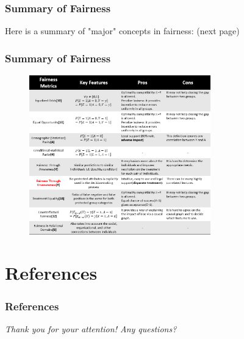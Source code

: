 \documentclass{beamer}
\begin{document}
\begin{frame}
\frametitle{Summary of Fairness}

Here is a summary of "major" concepts in fairness: (next page)

\end{frame}

\begin{frame}
\frametitle{Summary of Fairness}

\begin{figure}[hbt]
  \includegraphics[width=0.7\textwidth]{table.png}
\end{figure}
\end{frame}


\section{References}


\begin{frame}[allowframebreaks]
\frametitle{References}
\nocite{*}
\printbibliography
\end{frame}


\begin{frame}{}
  \centering \Large
  \emph{Thank you for your attention! Any questions?}
\end{frame}

\end{document}
